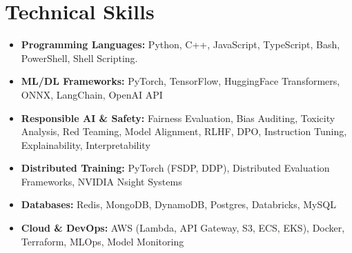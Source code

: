 \documentclass[11pt,a4paper]{article}
\begin{document}
\section*{Technical Skills}
\begin{itemize}
\item \textbf{Programming Languages:} Python, C++, JavaScript, TypeScript, Bash, PowerShell, Shell Scripting.
\item \textbf{ML/DL Frameworks:} PyTorch, TensorFlow, HuggingFace Transformers, ONNX, LangChain, OpenAI API
\item \textbf{Responsible AI \& Safety:} Fairness Evaluation, Bias Auditing, Toxicity Analysis, Red Teaming, Model Alignment, RLHF, DPO, Instruction Tuning, Explainability, Interpretability
\item \textbf{Distributed Training:} PyTorch (FSDP, DDP), Distributed Evaluation Frameworks, NVIDIA Nsight Systems
\item \textbf{Databases:} Redis, MongoDB, DynamoDB, Postgres, Databricks, MySQL
\item \textbf{Cloud \& DevOps:} AWS (Lambda, API Gateway, S3, ECS, EKS), Docker, Terraform, MLOps, Model Monitoring
\end{itemize}
\end{document}
